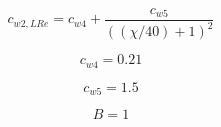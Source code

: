 

\begin{equation}
c_{w2,LRe} = c_{w4} + \frac{c_{w5}}{((\chi/40)+1)^2}
\end{equation}

\begin{equation}
c_{w4}=0.21
\end{equation}

\begin{equation}
c_{w5}=1.5
\end{equation}

\begin{equation}
B=1
\end{equation}


